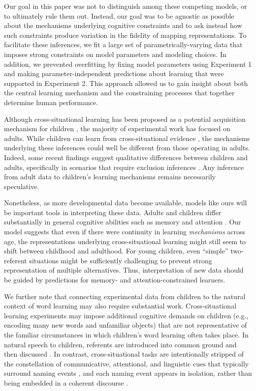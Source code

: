 \documentclass[authoryear,review]{elsarticle}
\begin{document}
Our goal in this paper was not to distinguish among these competing models, or to ultimately rule them out. Instead, our goal was to be agnostic as possible about the mechanisms underlying cognitive constraints and to ask instead how such constraints produce variation in the fidelity of mapping representations. To facilitate these inferences, we fit a large set of parametrically-varying data that imposes strong constraints on model parameters and modeling choices. In addition, we prevented overfitting by fixing model parameters using Experiment 1 and making parameter-independent predictions about learning that were supported in Experiment 2. This approach allowed us to gain insight about both the central learning mechanism and the constraining processes that together determine human performance.

Although cross-situational learning has been proposed as a potential acquisition mechanism for children \citep[e.g.][]{Pinker1989}, the majority of experimental work has focused on adults. While children can learn from cross-situational evidence \citep{Smith2008,Vlach2013,Suanda2014}, the mechanisms underlying these inferences could well be different from those operating in adults. Indeed, some recent findings suggest qualitative differences between children and adults, specifically in scenarios that require exclusion inferences \citep{Ramscar2013}. Any inference from adult data to children's learning mechanisms remains necessarily speculative.

Nonetheless, as more developmental data become available, models like ours will be important tools in interpreting these data. Adults and children differ substantially in general cognitive abilities such as memory and attention \citep[e.g.][]{Gathercole2004,Lane1982}. Our model suggests that even if there were continuity in learning \emph{mechanisms} across age, the representations underlying cross-situational learning might still seem to shift between childhood and adulthood. For young children, even ``simple'' two-referent situations might be sufficiently challenging to prevent strong representation of multiple alternatives. Thus, interpretation of new data should be guided by predictions for memory- and attention-constrained learners. 

We further note that connecting experimental data from children to the natural context of word learning may also require substantial work. Cross-situational learning experiments may impose additional cognitive demands on children (e.g., encoding many new words and unfamiliar objects) that are not representative of the familiar circumstances in which children's word learning often takes place. In natural speech to children, referents are introduced into common ground and then discussed \citep{Clark2003}. In contrast, cross-situational tasks are intentionally stripped of the constellation of communicative, attentional, and linguistic cues that typically surround naming events \citep{Frank2013a, Gogate2010, Mintz2003}, and each naming event appears in isolation, rather than being embedded in a coherent discourse \citep{Frank2013a, Rohde2014}. 
\end{document}
